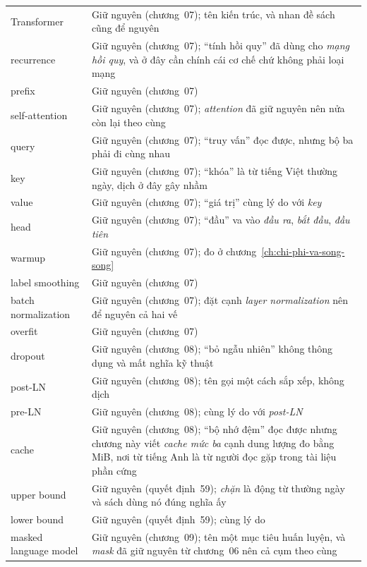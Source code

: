 \begin{longtable}{@{}lp{7cm}@{}}
Transformer & Giữ nguyên (chương~07); tên kiến trúc, và nhan đề sách cũng để nguyên \\
recurrence & Giữ nguyên (chương~07); \enquote{tính hồi quy} đã dùng cho \emph{mạng hồi quy}, và ở đây cần chính cái cơ chế chứ không phải loại mạng \\
prefix & Giữ nguyên (chương~07) \\
self-attention & Giữ nguyên (chương~07); \emph{attention} đã giữ nguyên nên nửa còn lại theo cùng \\
query & Giữ nguyên (chương~07); \enquote{truy vấn} đọc được, nhưng bộ ba phải đi cùng nhau \\
key & Giữ nguyên (chương~07); \enquote{khóa} là từ tiếng Việt thường ngày, dịch ở đây gây nhầm \\
value & Giữ nguyên (chương~07); \enquote{giá trị} cùng lý do với \emph{key} \\
head & Giữ nguyên (chương~07); \enquote{đầu} va vào \emph{đầu ra}, \emph{bắt đầu}, \emph{đầu tiên} \\
warmup & Giữ nguyên (chương~07); đo ở chương~\ref{ch:chi-phi-va-song-song} \\
label smoothing & Giữ nguyên (chương~07) \\
batch normalization & Giữ nguyên (chương~07); đặt cạnh \emph{layer normalization} nên để nguyên cả hai vế \\
overfit & Giữ nguyên (chương~07) \\
dropout & Giữ nguyên (chương~08); \enquote{bỏ ngẫu nhiên} không thông dụng và mất nghĩa kỹ thuật \\
post-LN & Giữ nguyên (chương~08); tên gọi một cách sắp xếp, không dịch \\
pre-LN & Giữ nguyên (chương~08); cùng lý do với \emph{post-LN} \\
cache & Giữ nguyên (chương~08); \enquote{bộ nhớ đệm} đọc được nhưng chương này viết \emph{cache mức ba} cạnh dung lượng đo bằng MiB, nơi từ tiếng Anh là từ người đọc gặp trong tài liệu phần cứng \\
upper bound & Giữ nguyên (quyết định~59); \emph{chặn} là động từ thường ngày và sách dùng nó đúng nghĩa ấy \\
lower bound & Giữ nguyên (quyết định~59); cùng lý do \\
masked language model & Giữ nguyên (chương~09); tên một mục tiêu huấn luyện, và \emph{mask} đã giữ nguyên từ chương~06 nên cả cụm theo cùng \\
\end{longtable}
\normalsize
